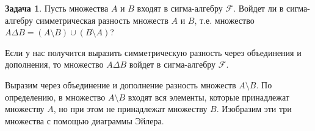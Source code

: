 \documentclass[pdftex, 12pt, a4paper]{article}
\def\F{\ensuremath{\mathcal{F}}} %
\def \Dt{\Delta}
\theoremstyle{definition} %
\newtheorem{problem}{Задача}
\numberwithin{problem}{section}
\numberwithin{blits}{section}
\begin{document}
\begin{problem}\label{simraz}
Пусть множества $A$ и $B$ входят в сигма-алгебру $\F$. Войдет ли в сигма-алгебру симметрическая разность множеств $A$ и $B$, т.е. множество $A \Delta B = (A \setminus B) \cup (B \setminus A)$?
\begin{sol}
Если у нас получится выразить симметрическую разность через объединения и дополнения, то множество $A \Dt B$ войдет в сигма-алгебру $\F$.

Выразим через объединение и дополнение разность множеств $A \setminus B$. По определению, в множество $A \setminus B$ входят вся элементы, которые принадлежат множеству $A$, но при этом не принадлежат множеству $B$. Изобразим эти три множества с помощью диаграммы Эйлера.

\begin{center}
\end{center}
\end{sol}
\end{problem}
\end{document}
